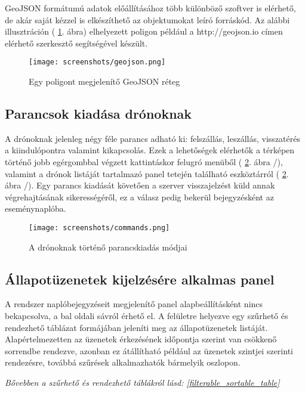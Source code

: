GeoJSON formátumú adatok előállításához több különböző szoftver is elérhető, de
akár saját kézzel is elkészíthető az objektumokat leíró forráskód. Az alábbi
illusztráción ( \ref{fig:geojson}. ábra) elhelyezett poligon például a
http://geojson.io címen elérhető szerkesztő segítségével készült.

\begin{figure}[H]
  \center
  \texttt{[image: screenshots/geojson.png]}
  \caption{Egy poligont megjelenítő GeoJSON réteg}
  \label{fig:geojson}
\end{figure}

\subsection{Parancsok kiadása drónoknak}

A drónoknak jelenleg négy féle parancs adható ki: felszállás, leszállás,
visszatérés a kiindulópontra valamint kikapcsolás. Ezek a lehetőségek elérhetők
a térképen történő jobb egérgombbal végzett kattintáskor felugró menüből
( \ref{fig:commands}. ábra /), valamint a drónok listáját tartalmazó
panel tetején található eszköztárról ( \ref{fig:commands}. ábra /).
Egy parancs kiadását követően a szerver visszajelzést küld annak végrehajtásának
sikerességéről, ez a válasz pedig bekerül bejegyzésként az eseménynaplóba.

\begin{figure}[H]
  \center
  \texttt{[image: screenshots/commands.png]}
  \caption{A drónoknak történő parancskiadás módjai}
  \label{fig:commands}
\end{figure}


\subsection{Állapotüzenetek kijelzésére alkalmas panel}

A rendszer naplóbejegyzéseit megjelenítő panel alapbeállításként nincs
bekapcsolva, a bal oldali sávról érhető el. A felületre helyezve egy szűrhető
és rendezhető táblázat formájában jeleníti meg az állapotüzenetek listáját.
Alapértelmezetten az üzenetek érkezésének időpontja szerint van csökkenő
sorrendbe rendezve, azonban ez átállítható például az üzenetek szintjei szerinti
rendezésre, továbbá szűrések alkalmazhatók bármelyik oszlopon.

\textit{
  Bővebben a szűrhető és rendezhető táblákról lásd:
  \ref{filterable_sortable_table}
}

